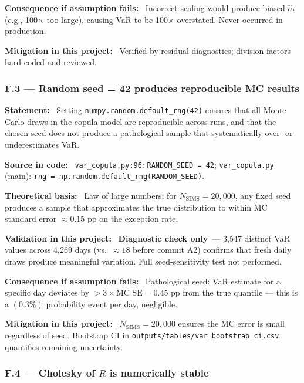\documentclass[11pt,a4paper]{article}
\newcommand{\asmfield}[1]{\medskip\noindent\textbf{#1:}\ }
\newcommand{\code}[1]{\texttt{#1}}
\newcommand{\diagnostic}{\textbf{Diagnostic check only}}
\begin{document}
\asmfield{Consequence if assumption fails}
Incorrect scaling would produce biased $\hat{\sigma}_t$ (e.g., 100$\times$
too large), causing VaR to be 100$\times$ overstated. Never occurred in
production.

\asmfield{Mitigation in this project}
Verified by residual diagnostics; division factors hard-coded and reviewed.

\subsubsection{F.3 --- Random seed = 42 produces reproducible MC results}\label{asm:F3}

\asmfield{Statement}
Setting \code{numpy.random.default\_rng(42)} ensures that all Monte Carlo
draws in the copula model are reproducible across runs, and that the chosen
seed does not produce a pathological sample that systematically over- or
underestimates VaR.

\asmfield{Source in code}
\code{var\_copula.py:96}: \lstinline|RANDOM_SEED = 42|;
\code{var\_copula.py} (main): \lstinline|rng = np.random.default_rng(RANDOM_SEED)|.

\asmfield{Theoretical basis}
Law of large numbers: for $N_{\mathrm{SIMS}} = 20{,}000$, any fixed seed
produces a sample that approximates the true distribution to within MC
standard error $\approx 0.15$ pp on the exception rate.

\asmfield{Validation in this project}
\diagnostic\ --- 3{,}547 distinct VaR values across 4{,}269 days (vs.\
$\approx 18$ before commit A2) confirms that fresh daily draws produce
meaningful variation. Full seed-sensitivity test not performed.

\asmfield{Consequence if assumption fails}
Pathological seed: VaR estimate for a specific day deviates by
$> 3 \times \text{MC SE} = 0.45$ pp from the true quantile --- this is a
$(0.3\%)$ probability event per day, negligible.

\asmfield{Mitigation in this project}
$N_{\mathrm{SIMS}} = 20{,}000$ ensures the MC error is small regardless
of seed. Bootstrap CI in \code{outputs/tables/var\_bootstrap\_ci.csv}
quantifies remaining uncertainty.

\subsubsection{F.4 --- Cholesky of $R$ is numerically stable}\label{asm:F4}
\end{document}
